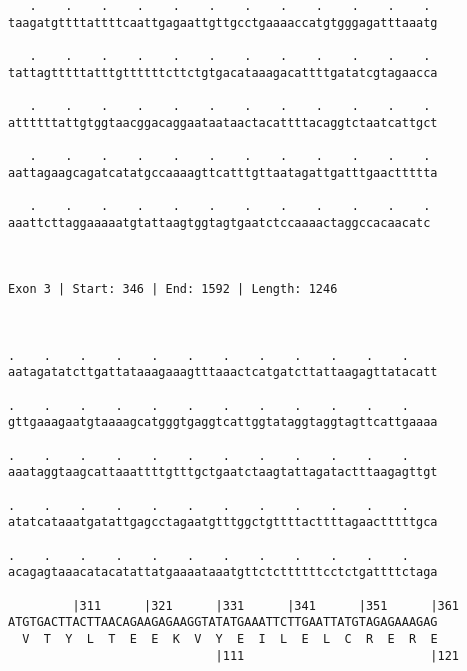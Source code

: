 \documentclass{article}
\begin{document}
\begin{Verbatim}
   .    .    .    .    .    .    .    .    .    .    .    . 
taagatgttttattttcaattgagaattgttgcctgaaaaccatgtgggagatttaaatg
                                                            
   .    .    .    .    .    .    .    .    .    .    .    . 
tattagtttttatttgttttttcttctgtgacataaagacattttgatatcgtagaacca
                                                            
   .    .    .    .    .    .    .    .    .    .    .    . 
attttttattgtggtaacggacaggaataataactacattttacaggtctaatcattgct
                                                            
   .    .    .    .    .    .    .    .    .    .    .    . 
aattagaagcagatcatatgccaaaagttcatttgttaatagattgatttgaacttttta
                                                            
   .    .    .    .    .    .    .    .    .    .    .    .
aaattcttaggaaaaatgtattaagtggtagtgaatctccaaaactaggccacaacatc
                                                           
                                                           
 
Exon 3 | Start: 346 | End: 1592 | Length: 1246



.    .    .    .    .    .    .    .    .    .    .    .    
aatagatatcttgattataaagaaagtttaaactcatgatcttattaagagttatacatt
                                                            
.    .    .    .    .    .    .    .    .    .    .    .    
gttgaaagaatgtaaaagcatgggtgaggtcattggtataggtaggtagttcattgaaaa
                                                            
.    .    .    .    .    .    .    .    .    .    .    .    
aaataggtaagcattaaattttgtttgctgaatctaagtattagatactttaagagttgt
                                                            
.    .    .    .    .    .    .    .    .    .    .    .    
atatcataaatgatattgagcctagaatgtttggctgttttacttttagaactttttgca
                                                            
.    .    .    .    .    .    .    .    .    .    .    .    
acagagtaaacatacatattatgaaaataaatgttctcttttttcctctgattttctaga
                                                            
         |311      |321      |331      |341      |351      |361
ATGTGACTTACTTAACAGAAGAGAAGGTATATGAAATTCTTGAATTATGTAGAGAAAGAG
  V  T  Y  L  T  E  E  K  V  Y  E  I  L  E  L  C  R  E  R  E
                             |111                          |121
  

\end{Verbatim}
\end{document}
